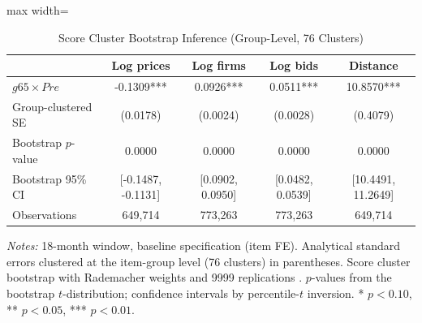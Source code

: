 \begin{table}[htbp]
\centering
\caption{Score Cluster Bootstrap Inference (Group-Level, 76 Clusters)}
\label{tab:wcb}
\begin{adjustbox}{max width=\textwidth}
\begin{threeparttable}
\small
\begin{tabular}{lcccc}
\toprule
 & Log prices & Log firms & Log bids & Distance \\
\midrule
$g65 \times Pre$ & -0.1309*** & 0.0926*** & 0.0511*** & 10.8570*** \\
Group-clustered SE & (0.0178) & (0.0024) & (0.0028) & (0.4079) \\
Bootstrap $p$-value & 0.0000 & 0.0000 & 0.0000 & 0.0000 \\
Bootstrap 95\% CI & [-0.1487, -0.1131] & [0.0902, 0.0950] & [0.0482, 0.0539] & [10.4491, 11.2649] \\
\midrule
Observations & 649,714 & 773,263 & 773,263 & 649,714 \\
\bottomrule
\end{tabular}
\begin{tablenotes}
\small
\item \textit{Notes:} 18-month window, baseline specification (item FE). Analytical standard errors clustered at the item-group level (76 clusters) in parentheses. Score cluster bootstrap with Rademacher weights and 9999 replications \citep{cameron2008}. $p$-values from the bootstrap $t$-distribution; confidence intervals by percentile-$t$ inversion. * $p<0.10$, ** $p<0.05$, *** $p<0.01$.
\end{tablenotes}
\end{threeparttable}
\end{adjustbox}
\end{table}

